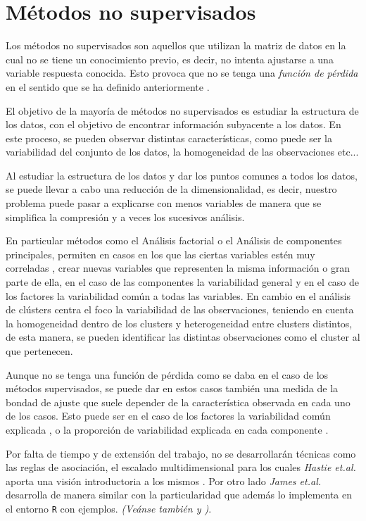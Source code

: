 \chapter{Métodos no supervisados}

\noindent Los métodos no supervisados son aquellos que utilizan la matriz de datos en la cual no se tiene un conocimiento previo, es decir, no intenta ajustarse a una variable respuesta conocida. Esto provoca que no se tenga una \emph{función de pérdida} en el sentido que se ha definido anteriormente \cite{Hastie 2001}. 

\noindent El objetivo de la mayoría de métodos no supervisados es estudiar la estructura de los datos, con el objetivo de encontrar información subyacente a los datos. En este proceso, se pueden observar distintas características, como puede ser la variabilidad del conjunto de los datos, la homogeneidad de las observaciones etc...

\noindent Al estudiar la estructura de los datos y dar los puntos comunes a todos los datos, se puede llevar a cabo una reducción de la dimensionalidad, es decir, nuestro problema puede pasar a explicarse con menos variables de manera que se simplifica la compresión \cite{Abdi 2010} y a veces los sucesivos análisis. 

\noindent En particular métodos como el Análisis factorial o el Análisis de componentes principales, permiten en casos en los que las ciertas variables estén muy correladas \cite{Everitt 2011}, crear nuevas variables que representen la misma información o gran parte de ella, en el caso de las componentes la variabilidad general y en el caso de los factores la variabilidad común a todas las variables. En cambio en el análisis de clústers centra el foco la variabilidad de las observaciones, teniendo en cuenta la homogeneidad dentro de los clusters y heterogeneidad entre clusters distintos, de esta manera, se pueden identificar las distintas observaciones como el cluster al que pertenecen. 

\noindent Aunque no se tenga una función de pérdida como se daba en el caso de los métodos supervisados, se puede dar en estos casos también una medida de la bondad de ajuste que suele depender de la característica observada en cada uno de los casos. Esto puede ser en el caso de los factores la variabilidad común explicada \cite{Peña 2002}, o la proporción de variabilidad explicada en cada componente \cite{Chatfield 1989}. 

\noindent Por falta de tiempo y de extensión del trabajo, no se desarrollarán técnicas como las reglas de asociación, el escalado multidimensional para los cuales \emph{Hastie et.al.} aporta una visión introductoria a los mismos \cite{Hastie 2001}. Por otro lado \emph{James et.al.}\cite{James 2013} desarrolla de manera similar con la particularidad  que además lo implementa en el entorno \texttt{R} con ejemplos. \emph{(Veánse también \cite{Everitt 2011} y \cite{Johnson 2007})}.

  


\newpage 

\newpage
